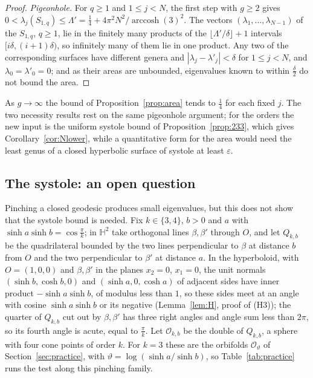 \documentclass[pdflatex,sn-mathphys-num]{sn-jnl}
\theoremstyle{thmstyleone}%
\theoremstyle{thmstylethree}%
\newcommand{\Orb}{\mathcal{O}}
\newcommand{\Hb}{\mathbb{H}^2}
\begin{document}
\begin{proof}
\emph{Pigeonhole.} For $q\ge1$ and $1\le j<N$, the first step with $g\ge2$ gives $0<\lambda_j(S_{1,q})\le\Lambda'=\frac14+4\pi^2N^2/\operatorname{arccosh}(3)^2$. The vectors $(\lambda_1,\dots,\lambda_{N-1})$ of the $S_{1,q}$, $q\ge1$, lie in the finitely many products of the $\lfloor\Lambda'/\delta\rfloor+1$ intervals $[i\delta,(i+1)\delta)$, so infinitely many of them lie in one product. Any two of the corresponding surfaces have different genera and $|\lambda_j-\lambda'_j|<\delta$ for $1\le j<N$, and $\lambda_0=\lambda'_0=0$; and as their areas are unbounded, eigenvalues known to within $\frac\delta2$ do not bound the area.
\end{proof}

As $g\to\infty$ the bound of Proposition~\ref{prop:area} tends to $\frac14$ for each fixed $j$. The two necessity results rest on the same pigeonhole argument; for the orders the new input is the uniform systole bound of Proposition~\ref{prop:233}, which gives Corollary~\ref{cor:Nlower}, while a quantitative form for the area would need the least genus of a closed hyperbolic surface of systole at least $\varepsilon$.

\subsection{The systole: an open question}\label{sec:systole}

Pinching a closed geodesic produces small eigenvalues, but this does not show that the systole bound is needed. Fix $k\in\{3,4\}$, $b>0$ and $a$ with $\sinh a\sinh b=\cos\frac\pi k$; in $\Hb$ take orthogonal lines $\beta,\beta'$ through $O$, and let $Q_{k,b}$ be the quadrilateral bounded by the two lines perpendicular to $\beta$ at distance $b$ from $O$ and the two perpendicular to $\beta'$ at distance $a$. In the hyperboloid, with $O=(1,0,0)$ and $\beta,\beta'$ in the planes $x_2=0$, $x_1=0$, the unit normals $(\sinh b,\cosh b,0)$ and $(\sinh a,0,\cosh a)$ of adjacent sides have inner product $-\sinh a\sinh b$, of modulus less than $1$, so these sides meet at an angle with cosine $\sinh a\sinh b$ or its negative (Lemma~\ref{lem:H}, proof of (H3)); the quarter of $Q_{k,b}$ cut out by $\beta,\beta'$ has three right angles and angle sum less than $2\pi$, so its fourth angle is acute, equal to $\frac\pi k$. Let $\Orb_{k,b}$ be the double of $Q_{k,b}$, a sphere with four cone points of order $k$. For $k=3$ these are the orbifolds $\Orb_\vartheta$ of Section~\ref{sec:practice}, with $\vartheta=\log(\sinh a/\sinh b)$, so Table~\ref{tab:practice} runs the test along this pinching family.
\end{document}
